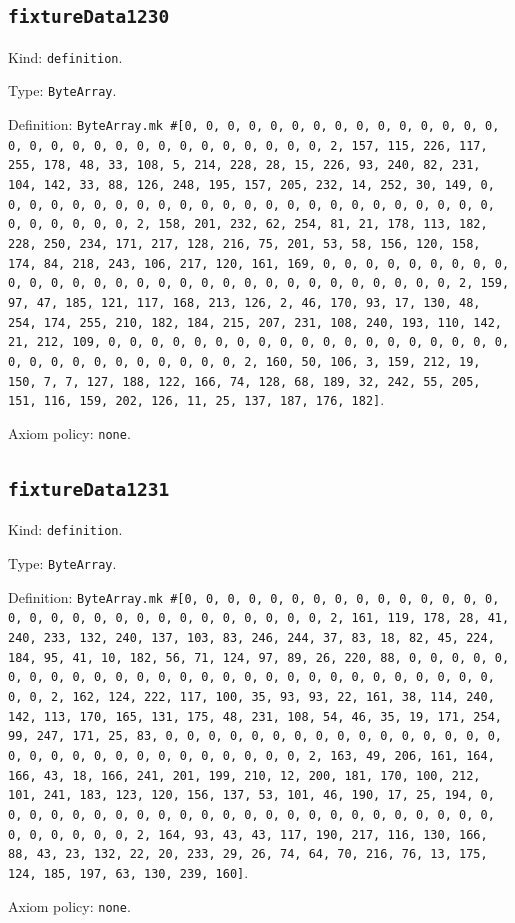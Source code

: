 \documentclass[11pt]{article}
\begin{document}
\subsection*{\texttt{fixtureData1230}}
\noindent Kind: \texttt{definition}.\par
\noindent Type: \texttt{ByteArray}.\par
\noindent Definition: \texttt{ByteArray.mk \#[0, 0, 0, 0, 0, 0, 0, 0, 0, 0, 0, 0, 0, 0, 0, 0, 0, 0, 0, 0, 0, 0, 0, 0, 0, 0, 0, 0, 0, 0, 2, 157, 115, 226, 117, 255, 178, 48, 33, 108, 5, 214, 228, 28, 15, 226, 93, 240, 82, 231, 104, 142, 33, 88, 126, 248, 195, 157, 205, 232, 14, 252, 30, 149, 0, 0, 0, 0, 0, 0, 0, 0, 0, 0, 0, 0, 0, 0, 0, 0, 0, 0, 0, 0, 0, 0, 0, 0, 0, 0, 0, 0, 0, 0, 2, 158, 201, 232, 62, 254, 81, 21, 178, 113, 182, 228, 250, 234, 171, 217, 128, 216, 75, 201, 53, 58, 156, 120, 158, 174, 84, 218, 243, 106, 217, 120, 161, 169, 0, 0, 0, 0, 0, 0, 0, 0, 0, 0, 0, 0, 0, 0, 0, 0, 0, 0, 0, 0, 0, 0, 0, 0, 0, 0, 0, 0, 0, 0, 2, 159, 97, 47, 185, 121, 117, 168, 213, 126, 2, 46, 170, 93, 17, 130, 48, 254, 174, 255, 210, 182, 184, 215, 207, 231, 108, 240, 193, 110, 142, 21, 212, 109, 0, 0, 0, 0, 0, 0, 0, 0, 0, 0, 0, 0, 0, 0, 0, 0, 0, 0, 0, 0, 0, 0, 0, 0, 0, 0, 0, 0, 0, 0, 2, 160, 50, 106, 3, 159, 212, 19, 150, 7, 7, 127, 188, 122, 166, 74, 128, 68, 189, 32, 242, 55, 205, 151, 116, 159, 202, 126, 11, 25, 137, 187, 176, 182]}.\par
\noindent Axiom policy: \texttt{none}.\par
\subsection*{\texttt{fixtureData1231}}
\noindent Kind: \texttt{definition}.\par
\noindent Type: \texttt{ByteArray}.\par
\noindent Definition: \texttt{ByteArray.mk \#[0, 0, 0, 0, 0, 0, 0, 0, 0, 0, 0, 0, 0, 0, 0, 0, 0, 0, 0, 0, 0, 0, 0, 0, 0, 0, 0, 0, 0, 0, 2, 161, 119, 178, 28, 41, 240, 233, 132, 240, 137, 103, 83, 246, 244, 37, 83, 18, 82, 45, 224, 184, 95, 41, 10, 182, 56, 71, 124, 97, 89, 26, 220, 88, 0, 0, 0, 0, 0, 0, 0, 0, 0, 0, 0, 0, 0, 0, 0, 0, 0, 0, 0, 0, 0, 0, 0, 0, 0, 0, 0, 0, 0, 0, 2, 162, 124, 222, 117, 100, 35, 93, 93, 22, 161, 38, 114, 240, 142, 113, 170, 165, 131, 175, 48, 231, 108, 54, 46, 35, 19, 171, 254, 99, 247, 171, 25, 83, 0, 0, 0, 0, 0, 0, 0, 0, 0, 0, 0, 0, 0, 0, 0, 0, 0, 0, 0, 0, 0, 0, 0, 0, 0, 0, 0, 0, 0, 0, 2, 163, 49, 206, 161, 164, 166, 43, 18, 166, 241, 201, 199, 210, 12, 200, 181, 170, 100, 212, 101, 241, 183, 123, 120, 156, 137, 53, 101, 46, 190, 17, 25, 194, 0, 0, 0, 0, 0, 0, 0, 0, 0, 0, 0, 0, 0, 0, 0, 0, 0, 0, 0, 0, 0, 0, 0, 0, 0, 0, 0, 0, 0, 0, 2, 164, 93, 43, 43, 117, 190, 217, 116, 130, 166, 88, 43, 23, 132, 22, 20, 233, 29, 26, 74, 64, 70, 216, 76, 13, 175, 124, 185, 197, 63, 130, 239, 160]}.\par
\noindent Axiom policy: \texttt{none}.\par
\end{document}
